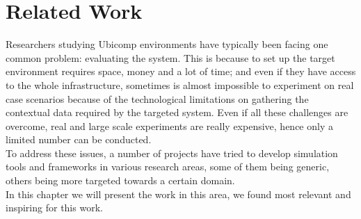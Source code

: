 \chapter{Related Work}\label{ch:related_work}

Researchers studying Ubicomp environments have typically been facing one common problem: evaluating the system. This is because to set up the target environment requires space, money and a lot of time; and even if they have access to the whole infrastructure, sometimes is almost impossible to experiment on real case scenarios because of the technological limitations on gathering the contextual data required by the targeted system. Even if all these challenges are overcome, real and large scale experiments are really expensive, hence only a limited number can be conducted.\\

To address these issues, a number of projects have tried to develop simulation tools and frameworks in various research areas, some of them being generic, others being more targeted towards a certain domain.\\

In this chapter we will present the work in this area, we found most relevant and inspiring for this work.











